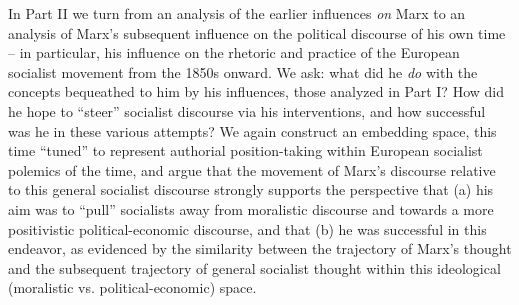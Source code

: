 In Part II we turn from an analysis of the earlier influences \textit{on} Marx to an analysis of Marx's subsequent influence on the political discourse of his own time -- in particular, his influence on the rhetoric and practice of the European socialist movement from the 1850s onward. We ask: what did he \textit{do} with the concepts bequeathed to him by his influences, those analyzed in Part I? How did he hope to ``steer'' socialist discourse via his interventions, and how successful was he in these various attempts? We again construct an embedding space, this time ``tuned'' to represent authorial position-taking within European socialist polemics of the time, and argue that the movement of Marx's discourse relative to this general socialist discourse strongly supports the perspective that (a) his aim was to ``pull'' socialists away from moralistic discourse and towards a more positivistic political-economic discourse, and that (b) he was successful in this endeavor, as evidenced by the similarity between the trajectory of Marx's thought and the subsequent trajectory of general socialist thought within this ideological (moralistic vs. political-economic) space.
